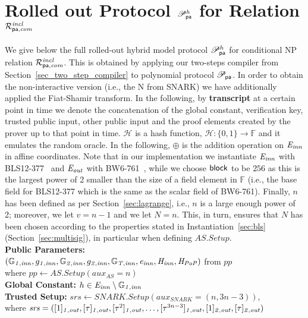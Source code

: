 \section{Rolled out Protocol $\mathscr{P}_{\mathsf{pa}}^{h}$ for Relation $\mathcal{R}^{\mathit{incl}}_{\mathsf{pa},\mathit{com}}$}
\label{sec:rolled_out}

\noindent We give below the full rolled-out hybrid model protocol $\mathscr{P}_{\mathsf{pa}}^{h}$ for conditional NP relation $\mathcal{R}^{\mathit{incl}}_{\mathsf{pa},\mathit{com}}$. This is obtained by applying 
our two-steps compiler from Section~\ref{sec_two_step_compiler} to polynomial protocol $\mathscr{P}_{\mathsf{pa}}$. In order to obtain the non-interactive version 
(i.e., the N from SNARK) we have additionally applied the Fiat-Shamir transform. In the following, by \textbf{transcript} at a certain point in time we denote the concatenation 
of the global constant, verification key, trusted public input, other public input and the proof elements created by the prover up to that point in time.
\noindent $\mathcal{H}$ is a hash function, $\mathcal{H}: \{0, 1\} \rightarrow \mathbb{F}$ and it emulates the random oracle.  
In the following, $\oplus$ is the addition operation on $\mathit{E}_{\mathit{inn}}$ in affine coordinates. Note that in our implementation we instantiate 
$\mathit{E}_{\mathit{inn}}$ with BLS12-377~\cite{zexe} and $\mathit{E}_{\mathit{out}}$ with BW6-761~\cite{BW6}, while we choose $\mathsf{block}$ to be $256$ as this is the largest power of 2 smaller 
than the size of a field element in $\mathbb{F}$ (i.e., the base field for BLS12-377 which is the same as the scalar field of BW6-761). 
Finally, $n$ has been defined as per Section~\ref{sec:lagrange}, i.e., $n$ is a large enough power of 2; 
moreover, we let $v= n-1$ and we let $N = n$. This, in turn, ensures that $N$ has been chosen according to the properties stated in 
Instantiation~\ref{sec:bls} (Section~\ref{sec:multisig}), in particular when defining $\mathit{AS.Setup}$. \\

\noindent \textbf{Public Parameters:} \\
$(\mathbb{G}_{\mathit{1,inn}}, g_{\mathit{1,inn}}, \mathbb{G}_{\mathit{2,inn}}, g_{\mathit{2,inn}}, \mathbb{G}_{\mathit{T,inn}}, \mathit{e}_{\mathit{inn}}, \mathit{H}_{\mathit{inn}}, \mathit{H}_{\mathit{PoP}})$ from $\mathit{pp}$ \\
where $\mathit{pp} \leftarrow \mathit{AS.Setup}(\mathit{aux_{\mathit{AS}}}= n)$ \\

\noindent \textbf{Global Constant:} $h \in \mathit{E}_{\mathit{inn}} \setminus \mathbb{G}_{\mathit{1,inn}}$ \\ 

\noindent \textbf{Trusted Setup:} $\mathit{srs} \leftarrow \mathit{SNARK.Setup}(\mathit{aux_{\mathit{SNARK}}} = (n, 3n-3))$,\\ 
where $\mathit{srs} =([1]_{\mathit{1,out}}, [\tau]_{\mathit{1,out}}, [\tau^2]_{\mathit{1,out}}, \ldots, [\tau^{3n-3}]_{\mathit{1,out}}, [1]_{\mathit{2,out}}, [\tau]_{\mathit{2,out}})$ \\

